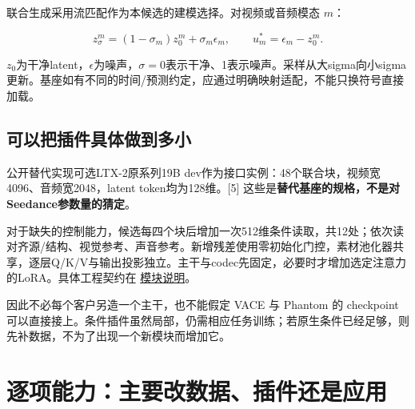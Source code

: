 联合生成采用流匹配作为本候选的建模选择。对视频或音频模态 \(m\)：

\[
z_\sigma^m=(1-\sigma_m)z_0^m+\sigma_m\epsilon_m,
\qquad u_m^*=\epsilon_m-z_0^m.
\]

\(z_0\)为干净latent，\(\epsilon\)为噪声，\(\sigma=0\)表示干净、1表示噪声。采样从大sigma向小sigma更新。基座如有不同的时间/预测约定，应通过明确映射适配，不能只换符号直接加载。

\subsection{可以把插件具体做到多小}\label{seedance-m27-ux53efux4ee5ux628aux63d2ux4ef6ux5177ux4f53ux505aux5230ux591aux5c0f}

公开替代实现可选LTX-2原系列19B dev作为接口实例：48个联合块，视频宽4096、音频宽2048，latent token均为128维。{[}5{]} 这些是\textbf{替代基座的规格，不是对Seedance参数量的猜定}。

对于缺失的控制能力，候选每四个块后增加一次512维条件读取，共12处；依次读对齐源/结构、视觉参考、声音参考。新增残差使用零初始化门控，素材池化器共享，逐层Q/K/V与输出投影独立。主干与codec先固定，必要时才增加选定注意力的LoRA。具体工程契约在 \hyperref[seedance-m21]{模块说明}。

因此不必每个客户另造一个主干，也不能假定 VACE 与 Phantom 的 checkpoint 可以直接接上。条件插件虽然局部，仍需相应任务训练；若原生条件已经足够，则先补数据，不为了出现一个新模块而增加它。

\section{逐项能力：主要改数据、插件还是应用}\label{seedance-m27-ux9010ux9879ux80fdux529bux4e3bux8981ux6539ux6570ux636eux63d2ux4ef6ux8fd8ux662fux5e94ux7528}

